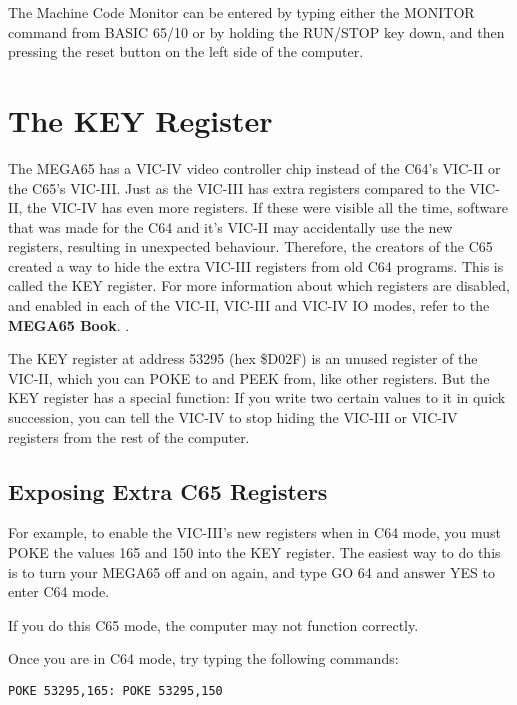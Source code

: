 The Machine Code Monitor can be entered by typing either the MONITOR
command from BASIC 65/10 or by holding the RUN/STOP key
down, and then pressing the reset button on the left side of the
computer.

\section{The KEY Register}

The MEGA65 has a VIC-IV video controller chip instead of the C64's VIC-II or
the C65's VIC-III.  Just as the VIC-III has extra registers compared to the
VIC-II, the VIC-IV has even more registers.  If these were visible all the time,
software that was made for the C64 and it's VIC-II may accidentally use the
new registers, resulting in unexpected behaviour.  Therefore, the
creators of the C65 created a way to hide the extra VIC-III registers from old
C64 programs. This is called the KEY register. For more information
about which registers are disabled, and enabled in each of the
VIC-II, VIC-III and VIC-IV IO modes, refer to
\ifdefined\printmanual
 the {\bf MEGA65 Book}.
\else
 .
\fi


The KEY register at address 53295 (hex \$D02F) is an unused register of the VIC-II, which you can POKE to and
PEEK from, like other registers.  But the KEY register has a special function: If
you write two certain values to it in quick succession, you can tell the VIC-IV
to stop hiding the VIC-III or VIC-IV registers from the rest of the computer.

\subsection{Exposing Extra C65 Registers}

For example, to enable the VIC-III's new registers when in C64 mode, you must POKE the values 165 and 150
into the KEY register. The easiest way to do this is to turn your MEGA65 off and on again, and type GO 64
and answer YES to enter C64 mode.

If you do this C65 mode, the computer may not function correctly.

Once you are in C64 mode, try typing the following commands:

\begin{tcolorbox}[colback=black,coltext=white]
\verbatimfont{\codefont}
\begin{verbatim}
POKE 53295,165: POKE 53295,150
\end{verbatim}
\end{tcolorbox}

